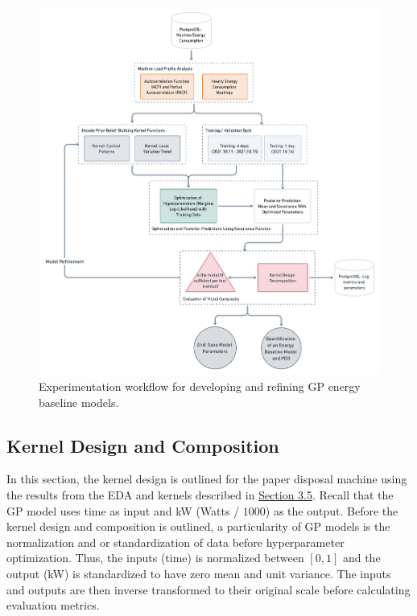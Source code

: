 \begin{figure}[H]
\centering
\graphicspath{ {./images/} }
\includegraphics[scale=0.32]{images/experiment_flow.png}
\caption{Experimentation workflow for developing and refining GP energy baseline models.}
\label{fig:fig12}
\end{figure}

\subsection{Kernel Design and Composition}

In this section, the kernel design is outlined for the paper disposal machine using the results from the EDA and kernels described in \hyperlink{subsection.3.5}{Section 3.5}. Recall that the GP model uses time as input and kW (Watts / $1000$) as the output. Before the kernel design and composition is outlined, a particularity of GP models is the normalization and or standardization of data before hyperparameter optimization. Thus, the inputs (time) is normalized between $[0, 1]$ and the output (kW) is standardized to have zero mean and unit variance. The inputs and outputs are then inverse transformed to their original scale before calculating evaluation metrics.

